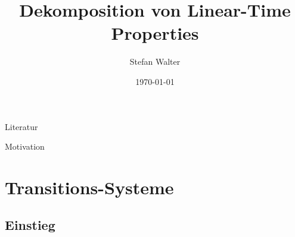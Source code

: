 \documentclass{beamer}
\begin{document}
\title[Decomposition Theorem]{Dekomposition von Linear-Time Properties}
\author{Stefan Walter}
\date{\today}


\begin{frame}{Literatur}
    \printbibliography
\end{frame}

\begin{frame}{Motivation}
    \begin{center}
        \usetikzlibrary{arrows}
    \end{center}
\end{frame}




\section{Transitions-Systeme}



\subsection{Einstieg}

\newcommand{\deftranssys}{
    \begin{Definition}[Transitions-System $TS$]
        $TS = (S, Act, \rightarrow, I, AP, L)$ mit:
        \begin{itemize}
            \setlength{\itemindent}{2.5cm}
            \item[$S$] Menge von Zust"anden (States)
            \item[$Act$] Menge von Aktionen (Actions)
            \item[$\rightarrow \; \subseteq \;  S \times Act \times S$] Transitions- ("Ubergangs-) Relation
            \item[$I \subseteq S$] Menge von initialen Zust"anden
            \item[$AP$] Menge von atomaren Aussagen \\ \hspace{5cm} (atomic propositions)
            \item[$L: S \rightarrow 2^{AP}$] Labeling-Funktion
        \end{itemize}
    \end{Definition}
}
\end{document}
